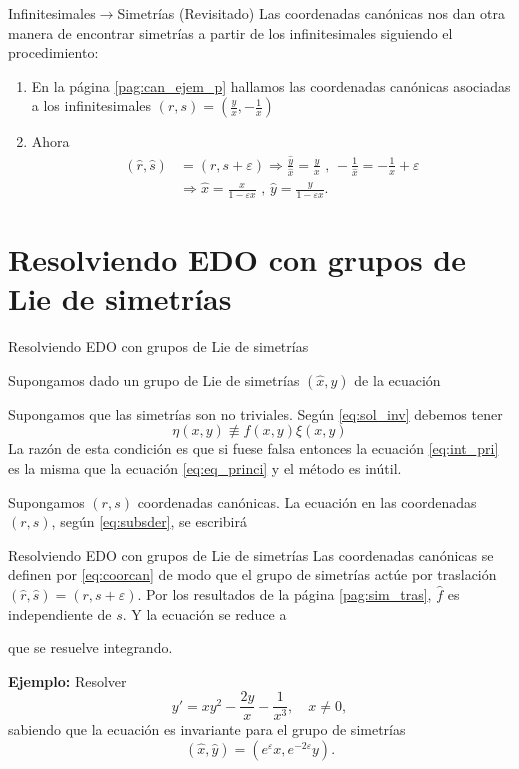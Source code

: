 \documentclass[handout,hyperref={colorlinks=true}]{beamer}
\renewcommand{\epsilon}{\varepsilon}
\newcommand{\nl}{\onslide<+-> }
\begin{document}
\begin{frame}{Infinitesimales$\to$Simetrías (Revisitado)}
\nl Las coordenadas canónicas nos dan otra manera de encontrar simetrías a partir de los infinitesimales siguiendo el procedimiento:

\begin{enumerate}
\item<+-> En la página \ref{pag:can_ejem_p} hallamos las coordenadas canónicas asociadas a los infinitesimales $(r,s)=\left(\frac{y}{x},-\frac{1}{x}\right)$
\item<+-> Ahora
\[\begin{split}
(\hat{r},\hat{s})&=(r,s+\epsilon)\Rightarrow \frac{\hat{y}}{\hat{x}}=\frac{y}{x}\text{ , }-\frac{1}{\hat{x}}=-\frac{1}{x}+\epsilon\\
&\Rightarrow \hat{x}=\frac{x}{1-\epsilon x} \text{ , } \hat{y}=\frac{y}{1-\epsilon x}.
\end{split}
\] 
\end{enumerate}

\end{frame}

\section[Resolviendo EDO]{Resolviendo EDO con grupos de Lie de simetrías}

\begin{frame}{Resolviendo EDO con grupos de Lie de simetrías}

\onslide<+-> Supongamos dado  un grupo de Lie de simetrías $(\hat{x},\hat{y})$ de la ecuación

\onslide<+-> Supongamos  que las simetrías son no triviales. Según \eqref{eq:sol_inv} debemos tener
 \[\eta(x,y)\not\equiv f(x,y)\xi(x,y)\]
La razón de esta condición es que si fuese falsa entonces la ecuación \eqref{eq:int_pri} es la misma que la ecuación \eqref{eq:eq_princi} y el método es inútil.

\onslide<+->Supongamos $(r,s)$ coordenadas canónicas. La ecuación en las coordenadas $(r,s)$, según \eqref{eq:subsder}, se escribirá
 
\end{frame}


\begin{frame}{Resolviendo EDO con grupos de Lie de simetrías}
\onslide<+->Las coordenadas canónicas se definen por \eqref{eq:coorcan} de modo que el grupo de simetrías actúe por traslación $(\hat{r},\hat{s})=(r,s+\epsilon)$. 
\onslide<+->Por los resultados de la página  \ref{pag:sim_tras}, $\hat{f}$ es independiente de $s$. Y la ecuación se reduce a

que se resuelve integrando.


\onslide<+->\textbf{Ejemplo:} Resolver 
\[y'=xy^2-\frac{2y}{x}-\frac{1}{x^3},\quad x\neq 0,\]
sabiendo que la ecuación es invariante para el grupo de simetrías
\[(\hat{x},\hat{y})=(e^{\epsilon}x,e^{-2\epsilon}y).\]
\end{frame}
\end{document}
